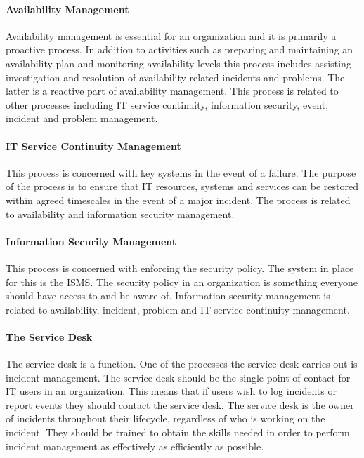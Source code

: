 \paragraph{Availability Management}
Availability management is essential for an organization and it is primarily a proactive process. In addition to activities such as preparing and maintaining an availability plan and monitoring availability levels this process includes assisting investigation and resolution of availability-related incidents and problems. The latter is a reactive part of availability management. This process is related to other processes including IT service continuity, information security, event, incident and problem management.

\paragraph{IT Service Continuity Management}
This process is concerned with key systems in the event of a failure. The purpose of the process is to ensure that IT resources, systems and services can be restored within agreed timescales in the event of a major incident. The process is related to availability and information security management.

\paragraph{Information Security Management}
This process is concerned with enforcing the security policy. The system in place for this is the \acf{ISMS}. The security policy in an organization is something everyone should have access to and be aware of. Information security management is related to availability, incident, problem and IT service continuity management. 

\paragraph{The Service Desk}
The service desk is a function. One of the processes the service desk carries out is incident management. The service desk should be the single point of contact for IT users in an organization. This means that if users wish to log incidents or report events they should contact the service desk. The service desk is the owner of incidents throughout their lifecycle, regardless of who is working on the incident. They should be trained to obtain the skills needed in order to perform incident management as effectively as efficiently as possible.

